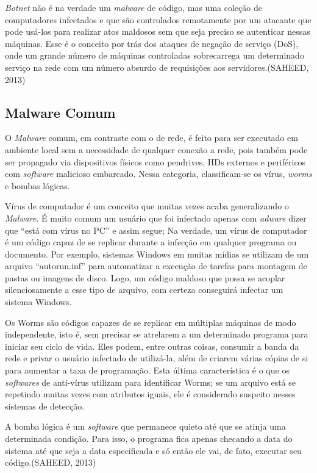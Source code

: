 \textit{Botnet} não é na verdade um \textit{malware} de código, mas uma coleção de computadores
infectados e que são controlados remotamente por um atacante que pode usá-los
para realizar atos maldosos sem que seja preciso se autenticar nessas
máquinas. Esse é o conceito por trás dos ataques de negação de serviço (DoS),
onde um grande número de máquinas controladas sobrecarrega um determinado
serviço na rede com um número absurdo de requisições aos servidores.(SAHEED, 2013)

\subsection{Malware Comum}
\label{ss.malware_comum}

O \textit{Malware} comum, em contraste com o de rede, é feito para ser executado em
ambiente local sem a necessidade de qualquer conexão a rede, pois também pode
ser propagado via dispositivos físicos como pendrives, HDs externos e
periféricos com \textit{software} malicioso embarcado. Nessa categoria, classificam-se os vírus, \textit{worms} e bombas lógicas.

Vírus de computador é um conceito que muitas vezes acaba generalizando o
\textit{Malware}. É muito comum um usuário que foi infectado apenas com \textit{adware} dizer
que ``está com vírus no PC'' e assim segue; Na verdade, um vírus de computador
é um código capaz de se replicar durante a infecção em qualquer programa ou
documento. Por exemplo, sistemas Windows em muitas mídias se utilizam de um
arquivo ``autorun.inf'' para automatizar a execução de tarefas para montagem
de pastas ou imagens de disco. Logo, um código maldoso que possa se acoplar
silenciosamente a esse tipo de arquivo, com certeza conseguirá infectar um
sistema Windows.

Os Worms são códigos capazes de se replicar em múltiplas máquinas de modo
independente, isto é, sem precisar se atrelarem a um determinado programa para
iniciar seu ciclo de vida. Eles podem, entre outras coisas, consumir a banda
da rede e privar o usuário infectado de utilizá-la, além de criarem várias
cópias de si para aumentar a taxa de programação. Esta última característica é
o que os \textit{softwares} de anti-vírus utilizam para identificar Worms; se um
arquivo está se repetindo muitas vezes com atributos iguais, ele é considerado
suspeito nesses sistemas de detecção.

A bomba lógica é um \textit{software} que permanece quieto até que se atinja uma
determinada condição. Para isso, o programa fica apenas checando a data do
sistema até que seja a data especificada e só então ele vai, de fato, executar
seu código.(SAHEED, 2013)

